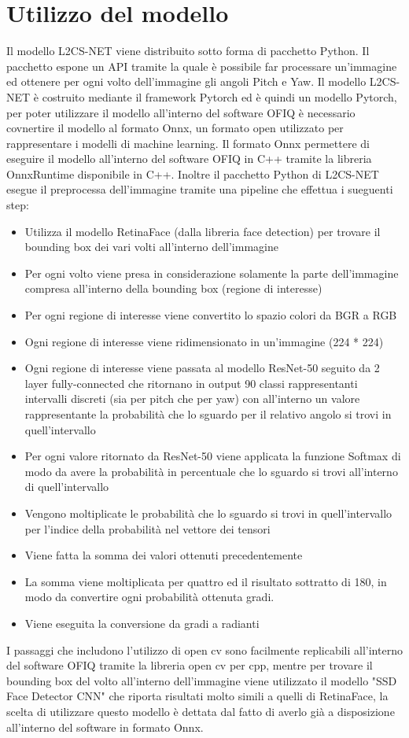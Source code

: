 \documentclass[12pt,a4paper,openright,twoside]{book}
\begin{document}
\section{Utilizzo del modello}
Il modello L2CS-NET viene distribuito sotto forma di pacchetto Python.
Il pacchetto espone un API tramite la quale è possibile far processare un'immagine ed ottenere per ogni volto dell'immagine gli angoli Pitch e Yaw.
Il modello L2CS-NET è costruito mediante il framework Pytorch ed è quindi un modello Pytorch, per poter utilizzare il modello all'interno del software OFIQ è necessario covnertire il modello al formato Onnx, un formato open utilizzato per rappresentare i modelli di machine learning.
Il formato Onnx permettere di eseguire il modello all'interno del software OFIQ in C++ tramite la libreria OnnxRuntime disponibile in C++.
Inoltre il pacchetto Python di L2CS-NET esegue il preprocessa dell'immagine tramite una pipeline che effettua i sueguenti step: \begin{itemize}
    \item Utilizza il modello RetinaFace (dalla libreria face detection) per trovare il bounding box dei vari volti all'interno dell'immagine
    \item Per ogni volto viene presa in considerazione solamente la parte dell'immagine compresa all'interno della bounding box (regione di interesse)
    \item Per ogni regione di interesse viene convertito lo spazio colori da BGR a RGB
    \item Ogni regione di interesse viene ridimensionato in un'immagine (224 * 224)
    \item Ogni regione di interesse viene passata al modello ResNet-50 seguito da 2 layer fully-connected che ritornano in output 90 classi rappresentanti intervalli discreti (sia per pitch che per yaw) con all'interno un valore rappresentante la probabilità che lo sguardo per il relativo angolo si trovi in quell'intervallo
    \item Per ogni valore ritornato da ResNet-50 viene applicata la funzione Softmax di modo da avere la probabilità in percentuale che lo sguardo si trovi all'interno di quell'intervallo
    \item Vengono moltiplicate le probabilità che lo sguardo si trovi in quell'intervallo per l'indice della probabilità nel vettore dei tensori
    \item Viene fatta la somma dei valori ottenuti precedentemente
    \item La somma viene moltiplicata per quattro ed il risultato sottratto di 180, in modo da convertire ogni probabilità ottenuta gradi.
    \item Viene eseguita la conversione da gradi a radianti
\end{itemize}
I passaggi che includono l'utilizzo di open cv sono facilmente replicabili all'interno del software OFIQ tramite la libreria open cv per cpp, mentre per trovare il bounding box del volto all'interno dell'immagine viene utilizzato il modello "SSD Face Detector CNN" che riporta risultati molto simili a quelli di RetinaFace, la scelta di utilizzare questo modello è dettata dal fatto di averlo già a disposizione all'interno del software in formato Onnx.
\end{document}
